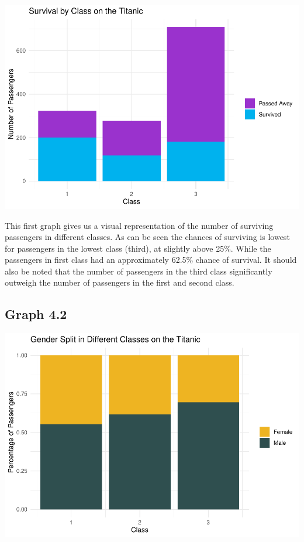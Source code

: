 \documentclass[
  11pt,
]{article}
\begin{document}
\includegraphics{README_files/figure-latex/unnamed-chunk-2-1.pdf}

This first graph gives us a visual representation of the number of
surviving passengers in different classes. As can be seen the chances of
surviving is lowest for passengers in the lowest class (third), at
slightly above 25\%. While the passengers in first class had an
approximately 62.5\% chance of survival. It should also be noted that
the number of passengers in the third class significantly outweigh the
number of passengers in the first and second class.

\hypertarget{graph-4.2}{%
\subsection{Graph 4.2}\label{graph-4.2}}

\includegraphics{README_files/figure-latex/unnamed-chunk-3-1.pdf}
\end{document}
